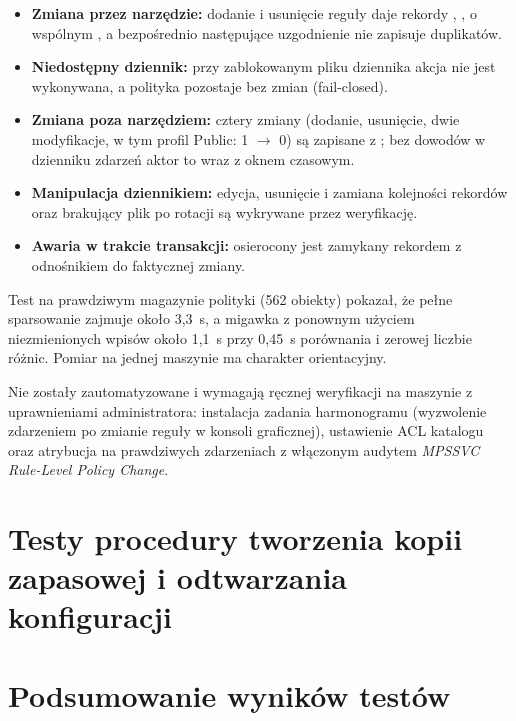 \begin{itemize}
  \item \textbf{Zmiana przez narzędzie:} dodanie i usunięcie reguły daje rekordy , ,  o wspólnym , a bezpośrednio następujące uzgodnienie nie zapisuje duplikatów.
  \item \textbf{Niedostępny dziennik:} przy zablokowanym pliku dziennika akcja nie jest wykonywana, a polityka pozostaje bez zmian (fail-closed).
  \item \textbf{Zmiana poza narzędziem:} cztery zmiany (dodanie, usunięcie, dwie modyfikacje, w tym profil Public:  1 $\rightarrow$ 0) są zapisane z ; bez dowodów w dzienniku zdarzeń aktor to  wraz z oknem czasowym.
  \item \textbf{Manipulacja dziennikiem:} edycja, usunięcie i zamiana kolejności rekordów oraz brakujący plik po rotacji są wykrywane przez weryfikację.
  \item \textbf{Awaria w trakcie transakcji:} osierocony  jest zamykany rekordem  z odnośnikiem do faktycznej zmiany.
\end{itemize}

Test na prawdziwym magazynie polityki (562 obiekty) pokazał, że pełne sparsowanie zajmuje około 3,3~s, a migawka z ponownym użyciem niezmienionych wpisów około 1,1~s przy 0,45~s porównania i zerowej liczbie różnic. Pomiar na jednej maszynie ma charakter orientacyjny.

Nie zostały zautomatyzowane i wymagają ręcznej weryfikacji na maszynie z uprawnieniami administratora: instalacja zadania harmonogramu (wyzwolenie zdarzeniem po zmianie reguły w konsoli graficznej), ustawienie ACL katalogu  oraz atrybucja na prawdziwych zdarzeniach z włączonym audytem \emph{MPSSVC Rule-Level Policy Change}.

\section{Testy procedury tworzenia kopii zapasowej i odtwarzania konfiguracji}\label{sec:testy-backup}

\section{Podsumowanie wyników testów}\label{sec:podsumowanie-testow}

